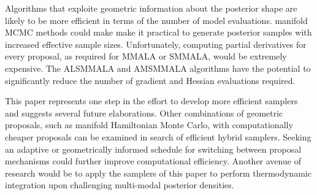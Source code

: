 \documentclass[twoside,11pt]{article}
\begin{document}
Algorithms that exploite geometric information about the posterior shape are likely to be more efficient in terms of the 
number of model evaluations. manifold MCMC methods could make make it practical to generate posterior samples with increased 
effective sample sizes. Unfortunately, computing partial derivatives for every proposal, as required for MMALA or SMMALA, 
would be extremely expensive. The ALSMMALA and AMSMMALA algorithms have the potential to significantly reduce the number of 
gradient and Hessian evaluations required.  

This paper represents one step in the effort to develop more efficient samplers and suggests several future elaborations.  
Other combinations of geometric proposals, such as manifold Hamiltonian Monte Carlo, with computationally cheaper proposals 
can be examined in search of efficient hybrid samplers. Seeking an adaptive or geometrically informed schedule for switching 
between proposal mechanisms could further improve computational efficiency. Another avenue of research would be to apply the 
samplers of this paper to perform thermodynamic integration upon challenging multi-modal posterior densities.   




\newpage

\vskip 0.2in

\end{document}
